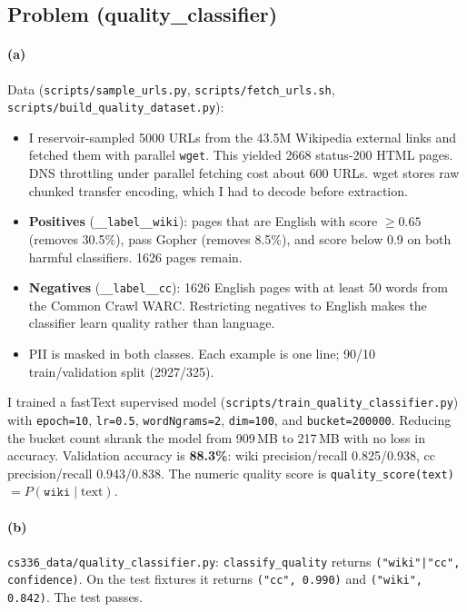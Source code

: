 \documentclass[11pt]{article}
\begin{document}
\subsection*{Problem (quality\_classifier)}

\paragraph{(a)} Data (\texttt{scripts/sample\_urls.py}, \texttt{scripts/fetch\_urls.sh},
\texttt{scripts/build\_quality\_dataset.py}):
\begin{itemize}
  \item I reservoir-sampled 5000 URLs from the 43.5M Wikipedia external links and fetched them with
  parallel \texttt{wget}. This yielded 2668 status-200 HTML pages. DNS throttling under parallel fetching
  cost about 600 URLs. wget stores raw chunked transfer encoding, which I had to decode before extraction.
  \item \textbf{Positives} (\texttt{\_\_label\_\_wiki}): pages that are English with score $\geq 0.65$ (removes 30.5\%), pass Gopher
  (removes 8.5\%), and score below 0.9 on both harmful classifiers. 1626 pages remain.
  \item \textbf{Negatives} (\texttt{\_\_label\_\_cc}): 1626 English pages with at least 50 words from the Common Crawl WARC.
  Restricting negatives to English makes the classifier learn quality rather than language.
  \item PII is masked in both classes. Each example is one line; 90/10 train/validation split (2927/325).
\end{itemize}
I trained a fastText supervised model (\texttt{scripts/train\_quality\_classifier.py}) with
\texttt{epoch=10}, \texttt{lr=0.5}, \texttt{wordNgrams=2}, \texttt{dim=100}, and
\texttt{bucket=200000}. Reducing the bucket count shrank the model from 909\,MB to 217\,MB with
no loss in accuracy. Validation accuracy is \textbf{88.3\%}: wiki precision/recall
0.825/0.938, cc precision/recall 0.943/0.838. The numeric quality score is
\texttt{quality\_score(text)} $=P(\texttt{wiki}\mid\text{text})$.

\paragraph{(b)} \texttt{cs336\_data/quality\_classifier.py}: \texttt{classify\_quality} returns
\texttt{("wiki"|"cc", confidence)}. On the test fixtures it returns \texttt{("cc", 0.990)} and
\texttt{("wiki", 0.842)}. The test passes.
\end{document}
